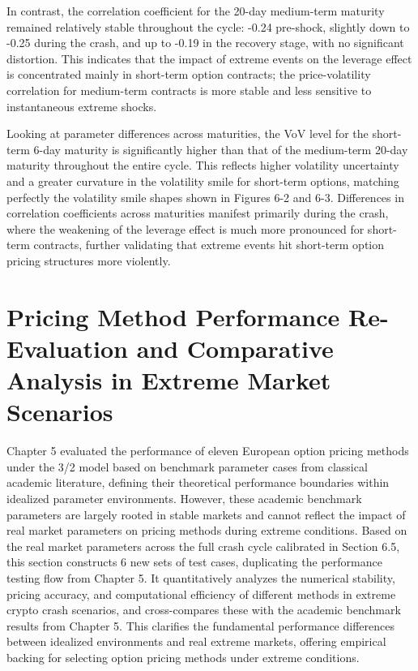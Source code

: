 In contrast, the correlation coefficient for the 20-day medium-term maturity remained relatively stable throughout the cycle: -0.24 pre-shock, slightly down to -0.25 during the crash, and up to -0.19 in the recovery stage, with no significant distortion. This indicates that the impact of extreme events on the leverage effect is concentrated mainly in short-term option contracts; the price-volatility correlation for medium-term contracts is more stable and less sensitive to instantaneous extreme shocks.

Looking at parameter differences across maturities, the VoV level for the short-term 6-day maturity is significantly higher than that of the medium-term 20-day maturity throughout the entire cycle. This reflects higher volatility uncertainty and a greater curvature in the volatility smile for short-term options, matching perfectly the volatility smile shapes shown in Figures 6-2 and 6-3. Differences in correlation coefficients across maturities manifest primarily during the crash, where the weakening of the leverage effect is much more pronounced for short-term contracts, further validating that extreme events hit short-term option pricing structures more violently.

\section{Pricing Method Performance Re-Evaluation and Comparative Analysis in Extreme Market Scenarios}

Chapter 5 evaluated the performance of eleven European option pricing methods under the 3/2 model based on benchmark parameter cases from classical academic literature, defining their theoretical performance boundaries within idealized parameter environments. However, these academic benchmark parameters are largely rooted in stable markets and cannot reflect the impact of real market parameters on pricing methods during extreme conditions. Based on the real market parameters across the full crash cycle calibrated in Section 6.5, this section constructs 6 new sets of test cases, duplicating the performance testing flow from Chapter 5. It quantitatively analyzes the numerical stability, pricing accuracy, and computational efficiency of different methods in extreme crypto crash scenarios, and cross-compares these with the academic benchmark results from Chapter 5. This clarifies the fundamental performance differences between idealized environments and real extreme markets, offering empirical backing for selecting option pricing methods under extreme conditions.


